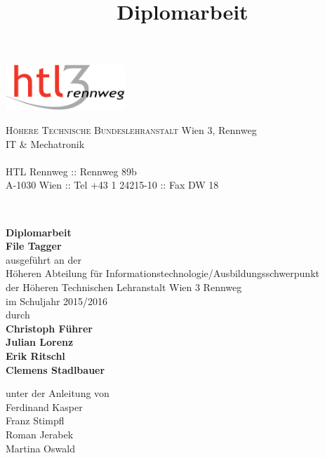 \documentclass[12pt,a4paper,naustrian,english,oneside,openright,DIV=12,BCOR=1cm]{scrbook}
\begin{document}
\title{Diplomarbeit}
\begin{titlepage}
\begin{minipage}[b]{1\columnwidth}
\parbox[b]{50mm}{\includegraphics[width=45mm]{images/htl3r-logo}}
\hfill
\parbox[b]{130mm}{\footnotesize \textsc{Höhere Technische Bundeslehranstalt} Wien 3, Rennweg\\
IT \& Mechatronik\\
\\
HTL Rennweg :: Rennweg 89b\\
A-1030 Wien :: Tel +43 1 24215-10 :: Fax DW 18
}\\
\mbox{}
\end{minipage}

\vspace{1cm}


\begin{center}
\textbf{\LARGE{}Diplomarbeit}{\large{}}\\
{\large{}\vspace{15mm}
 }
\textbf{\large{}File Tagger}\\
 \vspace{15mm}
 ausgeführt an der\\
 Höheren Abteilung für Informationstechnologie/Ausbildungsschwerpunkt\\
 der Höheren Technischen Lehranstalt Wien 3 Rennweg\\
 \vspace{1cm}
 im Schuljahr 2015/2016\\
 \vspace{1cm}
 durch\\
 \vspace{0.5cm}
\textbf{\large{}Christoph Führer}\\
\textbf{\large{}Julian Lorenz}\\
\textbf{\large{}Erik Ritschl}\\
\textbf{\large{}Clemens Stadlbauer}\\

\par\end{center}{\large \par}

\begin{center}
\vspace{20mm}
 \normalsize unter der Anleitung von\\
 \vspace{0.5cm}
 Ferdinand Kasper\\
Franz Stimpfl\\
Roman Jerabek\\
Martina Oswald \\
\par\end{center}


\end{titlepage}
\end{document}
